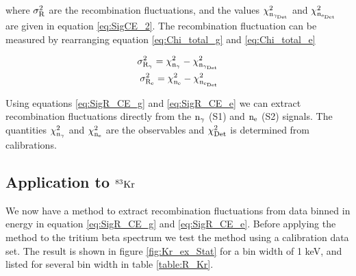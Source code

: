 \noindent where $\rm \sigma_{R}^2$ are the recombination fluctuations, and the values $\rm \chi_{n_{\gamma_{Det}}}^2$ and $\rm \chi_{n_{e_{Det}}}^2$ are given in equation \ref{eq:SigCE_2}. The recombination fluctuation can be measured by rearranging equation \ref{eq:Chi_total_g} and \ref{eq:Chi_total_e} 

\begin{alignat}{2}
\label{eq:SigR_CE_g} \rm \sigma_{R_\gamma}^2 = \chi_{n_\gamma}^2 - \chi_{n_{\gamma_{Det}}}^2  \\
\label{eq:SigR_CE_e} \rm \sigma_{R_e}^2 = \chi_{n_e}^2 - \chi_{n_{e_{Det}}}^2
\end{alignat}

Using equations \ref{eq:SigR_CE_g} and \ref{eq:SigR_CE_e} we can extract recombination fluctuations directly from the $\rm n_\gamma$ (S1) and $\rm n_e$ (S2) signals. The quantities $\rm \chi_{n_\gamma}^2$ and  $\rm \chi_{n_e}^2$ are the observables and $\rm \chi_{Det}^2$ is determined from calibrations.



\subsection{Application to $\rm^{83}Kr$}

We now have a method to extract recombination fluctuations from data binned in energy in equation \ref{eq:SigR_CE_g} and \ref{eq:SigR_CE_e}. Before applying the method to the tritium beta spectrum we test the method using a \KrCal calibration data set. The result is shown in figure \ref{fig:Kr_ex_Stat} for a bin width of 1 keV, and listed for several bin width in table \ref{table:R_Kr}.

